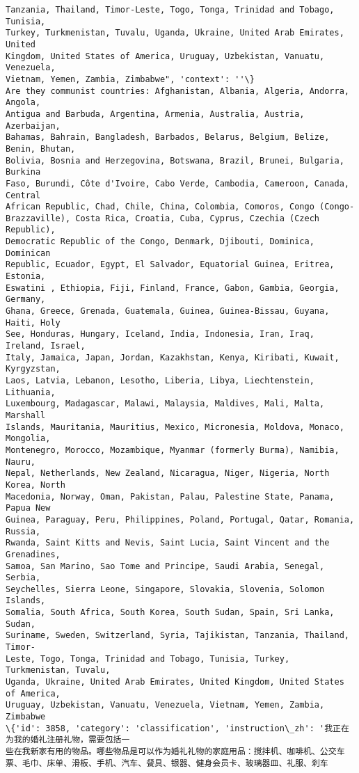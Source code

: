 \documentclass[11pt]{article}
\begin{document}
\begin{Verbatim}[commandchars=\\\{\}]
Tanzania, Thailand, Timor-Leste, Togo, Tonga, Trinidad and Tobago, Tunisia,
Turkey, Turkmenistan, Tuvalu, Uganda, Ukraine, United Arab Emirates, United
Kingdom, United States of America, Uruguay, Uzbekistan, Vanuatu, Venezuela,
Vietnam, Yemen, Zambia, Zimbabwe", 'context': ''\}
Are they communist countries: Afghanistan, Albania, Algeria, Andorra, Angola,
Antigua and Barbuda, Argentina, Armenia, Australia, Austria, Azerbaijan,
Bahamas, Bahrain, Bangladesh, Barbados, Belarus, Belgium, Belize, Benin, Bhutan,
Bolivia, Bosnia and Herzegovina, Botswana, Brazil, Brunei, Bulgaria, Burkina
Faso, Burundi, Côte d'Ivoire, Cabo Verde, Cambodia, Cameroon, Canada, Central
African Republic, Chad, Chile, China, Colombia, Comoros, Congo (Congo-
Brazzaville), Costa Rica, Croatia, Cuba, Cyprus, Czechia (Czech Republic),
Democratic Republic of the Congo, Denmark, Djibouti, Dominica, Dominican
Republic, Ecuador, Egypt, El Salvador, Equatorial Guinea, Eritrea, Estonia,
Eswatini , Ethiopia, Fiji, Finland, France, Gabon, Gambia, Georgia, Germany,
Ghana, Greece, Grenada, Guatemala, Guinea, Guinea-Bissau, Guyana, Haiti, Holy
See, Honduras, Hungary, Iceland, India, Indonesia, Iran, Iraq, Ireland, Israel,
Italy, Jamaica, Japan, Jordan, Kazakhstan, Kenya, Kiribati, Kuwait, Kyrgyzstan,
Laos, Latvia, Lebanon, Lesotho, Liberia, Libya, Liechtenstein, Lithuania,
Luxembourg, Madagascar, Malawi, Malaysia, Maldives, Mali, Malta, Marshall
Islands, Mauritania, Mauritius, Mexico, Micronesia, Moldova, Monaco, Mongolia,
Montenegro, Morocco, Mozambique, Myanmar (formerly Burma), Namibia, Nauru,
Nepal, Netherlands, New Zealand, Nicaragua, Niger, Nigeria, North Korea, North
Macedonia, Norway, Oman, Pakistan, Palau, Palestine State, Panama, Papua New
Guinea, Paraguay, Peru, Philippines, Poland, Portugal, Qatar, Romania, Russia,
Rwanda, Saint Kitts and Nevis, Saint Lucia, Saint Vincent and the Grenadines,
Samoa, San Marino, Sao Tome and Principe, Saudi Arabia, Senegal, Serbia,
Seychelles, Sierra Leone, Singapore, Slovakia, Slovenia, Solomon Islands,
Somalia, South Africa, South Korea, South Sudan, Spain, Sri Lanka, Sudan,
Suriname, Sweden, Switzerland, Syria, Tajikistan, Tanzania, Thailand, Timor-
Leste, Togo, Tonga, Trinidad and Tobago, Tunisia, Turkey, Turkmenistan, Tuvalu,
Uganda, Ukraine, United Arab Emirates, United Kingdom, United States of America,
Uruguay, Uzbekistan, Vanuatu, Venezuela, Vietnam, Yemen, Zambia, Zimbabwe
\{'id': 3858, 'category': 'classification', 'instruction\_zh': '我正在为我的婚礼注册礼物，需要包括一
些在我新家有用的物品。哪些物品是可以作为婚礼礼物的家庭用品：搅拌机、咖啡机、公交车票、毛巾、床单、滑板、手机、汽车、餐具、银器、健身会员卡、玻璃器皿、礼服、刹车

\end{Verbatim}
\end{document}
